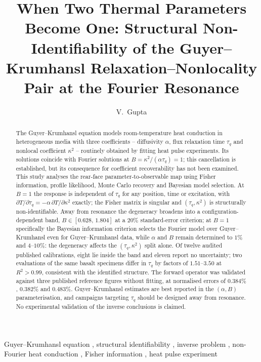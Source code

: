 \documentclass[preprint,12pt,a4paper]{elsarticle}
\theoremstyle{plain}
\theoremstyle{definition}
\theoremstyle{remark}
\begin{document}
\begin{frontmatter}

\title{When Two Thermal Parameters Become One: Structural Non-Identifiability
       of the Guyer--Krumhansl Relaxation--Nonlocality Pair at the Fourier
       Resonance}

\author{V.~Gupta}
\address{Department of [TO BE SUPPLIED], Gurugram University,
         Gurugram, Haryana, [POSTAL CODE -- TO BE SUPPLIED], India}

\begin{abstract}
The Guyer--Krumhansl equation models room-temperature heat conduction in
heterogeneous media with three coefficients -- diffusivity $\alpha$, flux
relaxation time $\tau_{q}$ and nonlocal coefficient $\kappa^{2}$ -- routinely
obtained by fitting heat pulse experiments. Its solutions coincide with
Fourier solutions at $B = \kappa^{2}/(\alpha\tau_{q}) = 1$; this cancellation
is established, but its consequence for coefficient recoverability has not
been examined. This study analyses the rear-face parameter-to-observable map
using Fisher information, profile likelihood, Monte Carlo recovery and
Bayesian model selection. At $B=1$ the response is independent of $\tau_{q}$
for any position, time or excitation, with $\partial T/\partial\tau_{q} =
-\alpha\,\partial T/\partial\kappa^{2}$ exactly; the Fisher matrix is singular
and $(\tau_{q},\kappa^{2})$ is structurally non-identifiable. Away from
resonance the degeneracy broadens into a configuration-dependent band,
$B \in [0.628,\,1.804]$ at a $20\%$ standard-error criterion; at $B=1$
specifically the Bayesian information criterion selects the Fourier model over
Guyer--Krumhansl even for Guyer--Krumhansl data, while $\alpha$ and $B$ remain
determined to $1\%$ and $4$--$10\%$: the degeneracy affects the
$(\tau_{q},\kappa^{2})$ split alone. Of twelve audited published calibrations,
eight lie inside the band and eleven report no uncertainty; two evaluations of
the same basalt specimens differ in $\tau_{q}$ by factors of $1.51$--$3.50$
at $R^{2}>0.99$, consistent with the identified structure. The forward
operator was validated against three published reference figures without
fitting, at normalised errors of $0.384\%$, $0.382\%$ and $0.483\%$.
Guyer--Krumhansl estimates are best reported in the $(\alpha,B)$
parameterisation, and campaigns targeting $\tau_{q}$ should be designed away
from resonance. No experimental validation of the inverse conclusions is
claimed.
\end{abstract}

\begin{keyword}
Guyer--Krumhansl equation \sep
structural identifiability \sep
inverse problem \sep
non-Fourier heat conduction \sep
Fisher information \sep
heat pulse experiment
\end{keyword}

\end{frontmatter}
\end{document}
